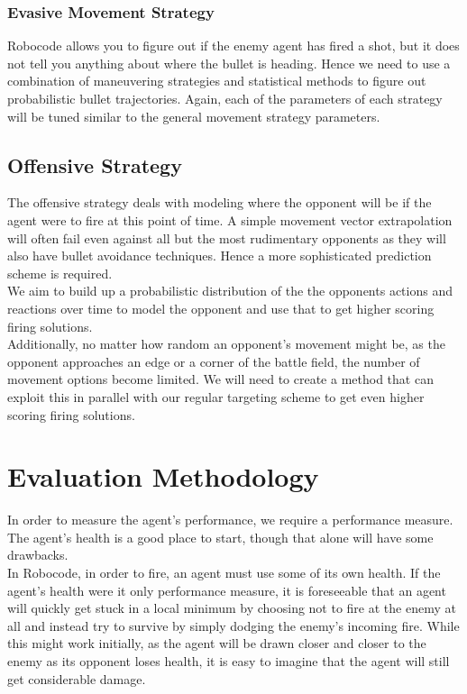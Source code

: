 \documentclass{article}
\theoremstyle{plain}
\theoremstyle{definition}
\theoremstyle{remark}
\begin{document}
\subsubsection*{Evasive Movement Strategy}
Robocode allows you to figure out if the enemy agent has fired a shot, but it does not tell you anything about where the bullet is heading. Hence we need to use a combination of maneuvering strategies and statistical methods to figure out probabilistic bullet trajectories. Again, each of the parameters of each strategy will be tuned similar to the general movement strategy parameters.

\subsection*{Offensive Strategy}
The offensive strategy deals with modeling where the opponent will be if the agent were to fire at this point of time. A simple movement vector extrapolation will often fail even against all but the most rudimentary opponents as they will also have bullet avoidance techniques. Hence a more sophisticated prediction scheme is required.\\

We aim to build up a probabilistic distribution of the the opponents actions and reactions over time to model the opponent and use that to get higher scoring firing solutions.\\

Additionally, no matter how random an opponent's movement might be, as the opponent approaches an edge or a corner of the battle field, the number of movement options become limited. We will need to create a method that can exploit this in parallel with our regular targeting scheme to get even higher scoring firing solutions.

\section*{Evaluation Methodology}
In order to measure the agent's performance, we require a performance measure. The agent's health is a good place to start, though that alone will have some drawbacks.\\

In Robocode, in order to fire, an agent must use some of its own health. If the agent's health were it only performance measure, it is foreseeable that an agent will quickly get stuck in a local minimum by choosing not to fire at the enemy at all and instead try to survive by simply dodging the enemy's incoming fire. While this might work initially, as the agent will be drawn closer and closer to the enemy as its opponent loses health, it is easy to imagine that the agent will still get considerable damage.\\
\end{document}
